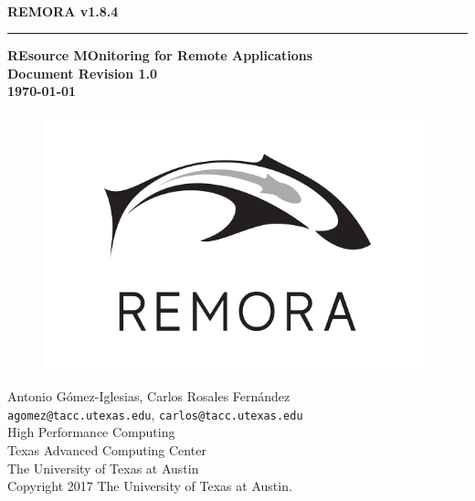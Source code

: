 \documentclass[10pt,a4paper]{report}
\begin{document}
\begin{titlepage}
\thispagestyle{empty}	%
\verb+ +
\vspace{1em}
\begin{flushright}
\huge\bf REMORA v1.8.4\\
\rule{\textwidth}{4pt}
\large{\bf REsource MOnitoring for Remote Applications\\
Document Revision 1.0\\
\today}
\end{flushright}

\begin{figure}[ht!]
	\centering
	\includegraphics[width=0.5\columnwidth]{logos/Remora-logo-600px.png}
\end{figure}

\newpage
\thispagestyle{empty}
\begin{flushleft}
Antonio G\'omez-Iglesias, Carlos Rosales Fern\'andez \\
\verb+agomez@tacc.utexas.edu+, \verb+carlos@tacc.utexas.edu+\\
\vspace{0.5em}
High Performance Computing \\
Texas Advanced Computing Center\\
The University of Texas at Austin\\
\vspace{1cm}
Copyright 2017 The University of Texas at Austin.
\end{flushleft}
\newpage
\end{titlepage}
\end{document}
